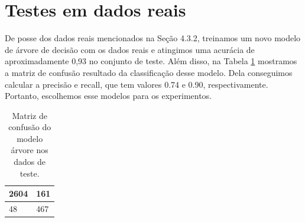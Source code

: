 \section{Testes em dados reais}

De posse dos dados reais mencionados na Seção 4.3.2, treinamos um novo modelo de árvore de decisão
com os dados reais e atingimos uma acurácia de aproximadamente 0,93 no conjunto de teste. Além disso,  
na Tabela \ref{tab:matriz_confusao} mostramos a matriz de confusão resultado da classificação desse modelo. 
Dela conseguimos calcular a precisão e recall, que tem valores 0.74 e 0.90, respectivamente. Portanto, 
escolhemos esse modelos para os experimentos.


\begin{table}[!ht]
    \centering
    \begin{tabular}{|l|l|}
    \hline
        2604 & 161 \\ \hline
        48 & 467 \\ \hline
    \end{tabular}
    \caption{Matriz de confusão do modelo árvore nos dados de teste.\label{tab:matriz_confusao}}
\end{table}

